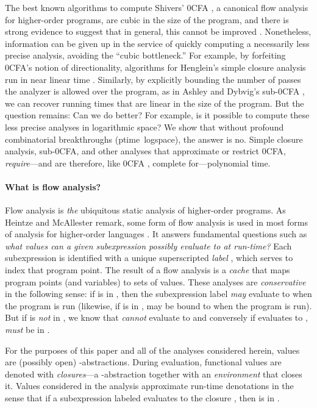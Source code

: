 \documentclass{llncs}
\newcommand\ptime{{\sc ptime}}
\newcommand\logspace{{\sc logspace}}
\begin{document}
The best known algorithms to compute Shivers' 0CFA \cite{shivers-88},
a canonical flow analysis for higher-order programs, are cubic in the
size of the program, and there is strong evidence to suggest that in
general, this cannot be improved \cite{heintze-mcallester-97b}.
Nonetheless, information can be given up in the service of quickly
computing a necessarily less precise analysis, avoiding the ``cubic
bottleneck.''  For example, by forfeiting 0CFA's notion of
directionality, algorithms for Henglein's simple closure analysis run
in near linear time \cite{henglein92d}.  Similarly, by explicitly
bounding the number of passes the analyzer is allowed over the
program, as in Ashley and Dybvig's sub-0CFA \cite{ashley-dybvig}, we
can recover running times that are linear in the size of the program.
But the question remains: Can we do better?  For example, is it
possible to compute these less precise analyses in logarithmic space?
We show that without profound combinatorial breakthroughs (\ptime\ 
\logspace), the answer is no.  Simple closure analysis, sub-0CFA, and
other analyses that approximate or restrict 0CFA, {\em require}---and
are therefore, like 0CFA \cite{vanhorn-mairson-07}, complete
for---polynomial time.


\paragraph{What is flow analysis?}

Flow analysis is {\em the} ubiquitous static analysis of higher-order
programs.  As Heintze and McAllester remark, some form of flow
analysis is used in most forms of analysis for higher-order languages
\cite{heintze-mcallester-97a}.  It answers fundamental questions such
as {\em what values can a given subexpression possibly evaluate to at
run-time?}  Each subexpression is identified with a unique
superscripted {\em label} , which serves to index that program
point.  The result of a flow analysis is a {\em cache}  that
maps program points (and variables) to sets of values.  These analyses
are {\em conservative} in the following sense: if  is in
, then the subexpression label  {\em may} evaluate
to  when the program is run (likewise, if  is in ,
 may be bound to  when the program is run).  But if  is {\em
not} in , we know that  {\em cannot} evaluate to 
and conversely if  evaluates to ,  {\em must} be in
.

For the purposes of this paper and all of the analyses considered
herein, values are (possibly open) -abstractions.  During
evaluation, functional values are denoted with {\em closures}---a
-abstraction together with an {\em environment} that closes
it.  Values considered in the analysis approximate run-time
denotations in the sense that if a subexpression labeled 
evaluates to the closure , then
 is in .
\end{document}
